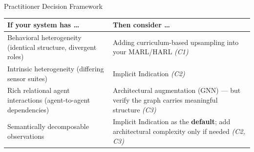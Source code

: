 \begin{frame}[shrink=5]{Practitioner Decision Framework}

    \vspace{2em}
    \centering
    \renewcommand{\arraystretch}{1.5}
    \small
    \begin{tabular}{@{} p{4.5cm} p{5.5cm} @{}}
        \toprule
        \textbf{If your system has \ldots}
            & \textbf{Then consider \ldots} \\
        \midrule
        Behavioral heterogeneity \newline
        {\scriptsize (identical structure, divergent roles)}
            & Adding curriculum-based upsampling into your
            MARL/HARL \hfill\emph{(C1)} \\
        Intrinsic heterogeneity \newline
        {\scriptsize (differing sensor suites)}
            & Implicit Indication \hfill\emph{(C2)} \\
        Rich relational agent interactions \newline
        {\scriptsize (agent-to-agent dependencies)}
            & Architectural augmentation (GNN) — but verify
              the graph carries meaningful structure
              \hfill\emph{(C3)} \\
        Semantically decomposable observations
            & Implicit Indication as the \textbf{default}; add
              architectural complexity only if needed
              \hfill\emph{(C2, C3)} \\
        \bottomrule
    \end{tabular}



\end{frame}
